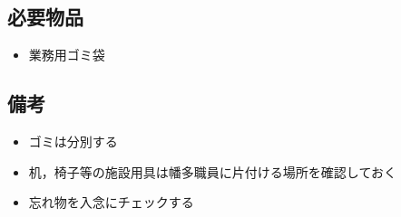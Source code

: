 
\subsection{必要物品}
\begin{itemize}
\item 業務用ゴミ袋
\end{itemize}

\newpage

\subsection{備考}
\begin{itemize}
\item ゴミは分別する
\item 机，椅子等の施設用具は幡多職員に片付ける場所を確認しておく
\item 忘れ物を入念にチェックする
\end{itemize}


%


